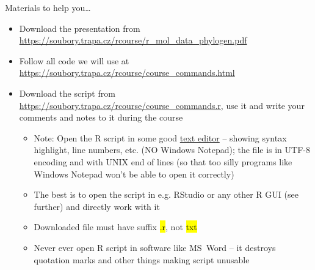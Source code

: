 \documentclass[compress, ucs, xelatex, 11pt, xcolor=svgnames,
  hyperref={
    bookmarks=true,
    unicode=true,
    colorlinks=true,
    pdftitle={Molecular data in R},
    plainpages=false,
    pdfauthor={Vojtech Zeisek},
    pdfsubject={Course about phylogeny and evolution in R},
    pdfcreator={XeLaTeX},
    pdfkeywords={R, evolution, phylogeny, molecular data},
    linkcolor=Tomato,
    anchorcolor=SaddleBrown,
    citecolor=Goldenrod,
    filecolor=DarkMagenta,
    menucolor=Sienna,
    urlcolor=DarkTurquoise,
    pdftex},
  url={hyphens, lowtilde} %
  ]{beamer}
\renewcommand{\texttt}[1]{\hl{\ttfamily #1}}
\begin{document}
\begin{frame}{Materials to help you\ldots}
\begin{itemize}
 \item Download the presentation from \url{https://soubory.trapa.cz/rcourse/r_mol_data_phylogen.pdf}
 \item Follow all code we will use at \url{https://soubory.trapa.cz/rcourse/course_commands.html}
 \item Download the script from \url{https://soubory.trapa.cz/rcourse/course_commands.r}, use it and write your comments and notes to it during the course
 \begin{itemize}
  \item \alert{Note:} Open the R script in some \alert{good} \href{http://texteditors.org/cgi-bin/wiki.pl?PickingATextEditor}{text editor} -- showing syntax highlight, line numbers, etc. (\alert{NO} Windows Notepad); the file is in UTF-8 encoding and with UNIX end of lines (so that too silly programs like Windows Notepad won't be able to open it correctly)
  \item The best is to open the script in e.g. RStudio or any other R GUI (see further) and directly work with it
  \item \alert{Downloaded file must have suffix \texttt{*.r}, not \texttt{*txt}}
  \item \alert{Never ever} open R script in software like MS~Word -- it destroys quotation marks and other things making script unusable
 \end{itemize}
\end{itemize}
\end{frame}
\end{document}
